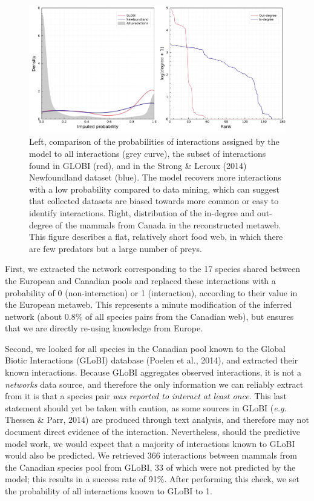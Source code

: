 \documentclass[11pt]{article}
\makeatletter
\def\maxwidth{\ifdim\Gin@nat@width>\linewidth\linewidth
\else\Gin@nat@width\fi}
\let\Oldincludegraphics\includegraphics
\renewcommand{\includegraphics}[1]{\Oldincludegraphics[width=\maxwidth]{#1}}
\makeatother
\begin{document}
\begin{figure}
\hypertarget{fig:inflation}{%
\centering
\includegraphics{figures/figure-validation.png}
\caption{Left, comparison of the probabilities of interactions assigned
by the model to all interactions (grey curve), the subset of
interactions found in GLOBI (red), and in the Strong \& Leroux (2014)
Newfoundland dataset (blue). The model recovers more interactions with a
low probability compared to data mining, which can suggest that
collected datasets are biased towards more common or easy to identify
interactions. Right, distribution of the in-degree and out-degree of the
mammals from Canada in the reconstructed metaweb. This figure describes
a flat, relatively short food web, in which there are few predators but
a large number of preys.}\label{fig:inflation}
}
\end{figure}

First, we extracted the network corresponding to the 17 species shared
between the European and Canadian pools and replaced these interactions
with a probability of 0 (non-interaction) or 1 (interaction), according
to their value in the European metaweb. This represents a minute
modification of the inferred network (about 0.8\% of all species pairs
from the Canadian web), but ensures that we are directly re-using
knowledge from Europe.

Second, we looked for all species in the Canadian pool known to the
Global Biotic Interactions (GLoBI) database (Poelen et al., 2014), and
extracted their known interactions. Because GLoBI aggregates observed
interactions, it is not a \emph{networks} data source, and therefore the
only information we can reliably extract from it is that a species pair
\emph{was reported to interact at least once}. This last statement
should yet be taken with caution, as some sources in GLoBI (\emph{e.g.}
Thessen \& Parr, 2014) are produced through text analysis, and therefore
may not document direct evidence of the interaction. Nevertheless,
should the predictive model work, we would expect that a majority of
interactions known to GLoBI would also be predicted. We retrieved 366
interactions between mammals from the Canadian species pool from GLoBI,
33 of which were not predicted by the model; this results in a success
rate of 91\%. After performing this check, we set the probability of all
interactions known to GLoBI to 1.
\end{document}
